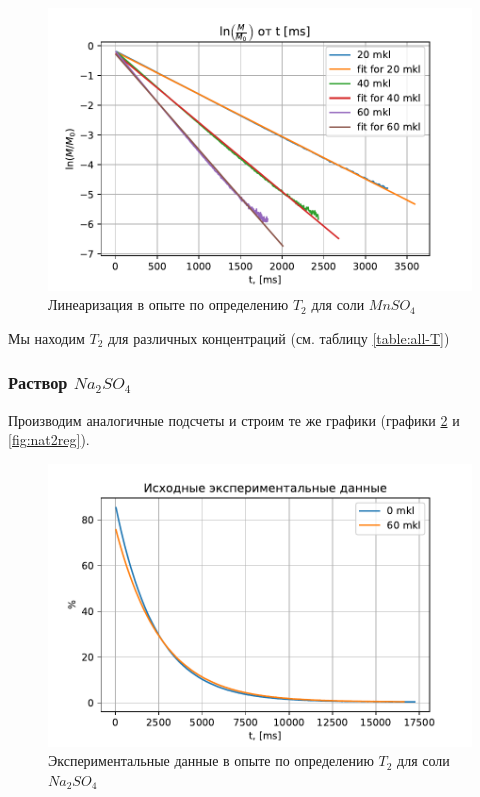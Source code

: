 \begin{figure}[!h]
	\hspace{-5em}
	\includegraphics[width=1.2\linewidth]{data/Mn_T_2_reg}
	\caption{Линеаризация в опыте по определению $ T_2 $ для соли $ Mn SO_4 $}
	\label{fig:mnt2reg}
\end{figure}

Мы находим $ T_2 $ для различных концентраций (см. таблицу \ref{table:all-T})

\subsubsection{Раствор $Na_2 SO_4$}
Производим аналогичные подсчеты и строим те же графики (графики \ref{fig:nat2exper} и \ref{fig:nat2reg}).

\begin{figure}[!h]
	\hspace{-5em}
	\includegraphics[width=1.2\linewidth]{data/Na_T_2_exper}
	\caption{Экспериментальные данные в опыте по определению $ T_2 $ для соли $ Na_2 SO_4 $}
	\label{fig:nat2exper}
\end{figure}

